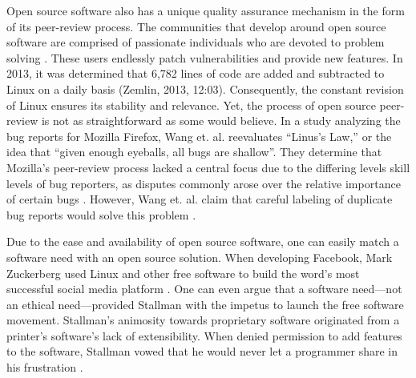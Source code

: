 Open source software also has a unique quality assurance mechanism in the form
of its peer-review process. The communities that develop around open source
software are comprised of passionate individuals who are devoted to problem
solving \cite[p. 19]{bisson}. These users endlessly patch vulnerabilities and
provide new features. In 2013, it was determined that 6,782 lines of code are
added and subtracted to Linux on a daily basis (Zemlin, 2013, 12:03).
Consequently, the  constant revision of Linux ensures its stability and
relevance. Yet, the process of open source peer-review is not as straightforward
as some would believe. In a study analyzing the bug reports for Mozilla Firefox,
Wang et. al. reevaluates “Linus's Law,” or the idea that “given enough eyeballs,
all bugs are shallow”\cite[p. 52]{wang}.  They determine that Mozilla's
peer-review process lacked a central focus due to the differing levels skill
levels of bug reporters, as disputes commonly arose over the relative importance
of certain bugs \citeyear[p. 52]{wang}. However, Wang et. al.  claim that
careful labeling of duplicate bug reports would solve this problem \citeyear[p.
52]{wang}.

Due to the ease and availability of open source software, one can easily match
a software need with an open source solution. When developing Facebook,
Mark Zuckerberg used Linux and other free software to build the word's most
successful social media platform \cite[6:18]{zemlin}. One can even argue that
a software need—not an ethical need—provided Stallman with the impetus to launch
the free software movement. Stallman's animosity towards proprietary software
originated from a printer's software's lack of extensibility. When denied
permission to add features to the software, Stallman vowed that he
would never let a programmer share in his frustration \citeyear[para.
19]{rms2015}.
